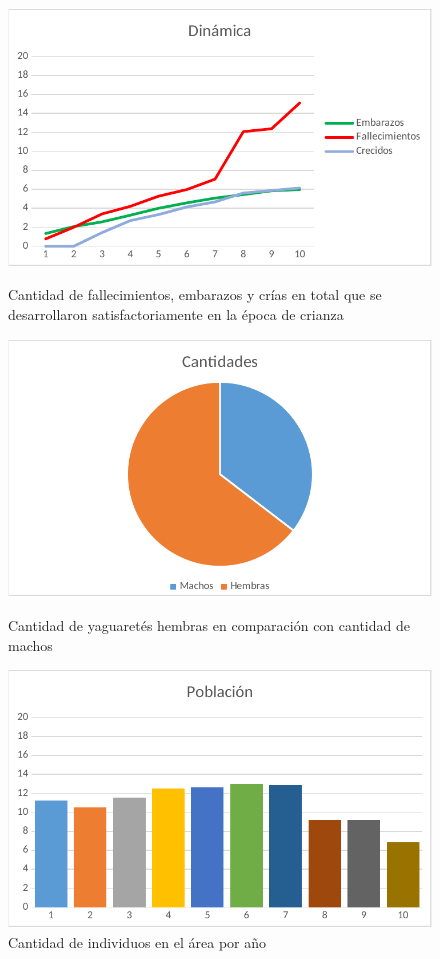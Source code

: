     \begin{figure}[!htb]
        \includegraphics[width=\linewidth]{images/esc1/dinamica}
        \caption{Cantidad de fallecimientos, embarazos y crías en total que se desarrollaron satisfactoriamente en la época de crianza}\label{fig:fig1-1}
        \endminipage\hfill
        \includegraphics[width=\linewidth]{images/esc1/genero}
        \caption{Cantidad de yaguaretés hembras en comparación con cantidad de machos}\label{fig:fig1-2}
        \endminipage\hfill
        \includegraphics[width=\linewidth]{images/esc1/densidad}
        \caption{Cantidad de individuos en el área por año}\label{fig:fig1-3}
        \endminipage
    \end{figure}

